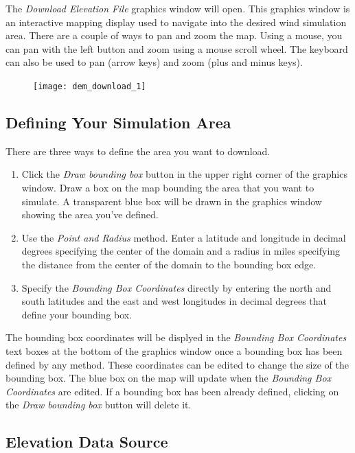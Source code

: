 \documentclass[12pt]{article}
\begin{document}
The \textit{Download Elevation File} graphics window will open. This graphics window is an interactive mapping display used to navigate into the desired wind simulation area. There are a couple of ways to pan and zoom the map.  Using a mouse, you can pan with the left button and zoom using a mouse scroll wheel.  The keyboard can also be used to pan (arrow keys) and zoom (plus and minus keys).

\begin{figure}[H]
	\centering
	\label{}
	\texttt{[image: dem\_download\_1]}
\end{figure}

\subsection*{Defining Your Simulation Area}

There are three ways to define the area you want to download. 
\begin{enumerate}
\item Click the \textit{Draw bounding box} button in the upper right corner of the graphics window. Draw a box on the map bounding the area that you want to simulate. A transparent blue box will be drawn in the graphics window showing the area you've defined. 
\item Use the \textit{Point and Radius} method. Enter a latitude and longitude in decimal degrees specifying the center of the domain and a radius in miles specifying the distance from the center of the domain to the bounding box edge.
\item Specify the \textit{Bounding Box Coordinates} directly by entering the north and south latitudes and the east and west longitudes in decimal degrees that define your bounding box.
\end{enumerate}
The bounding box coordinates will be displyed in the \textit{Bounding Box Coordinates} text boxes at the bottom of the graphics window once a bounding box has been defined by any method. These coordinates can be edited to change the size of the bounding box. The blue box on the map will update when the \textit{Bounding Box Coordinates} are edited. If a bounding box has been already defined, clicking on the \textit{Draw bounding box} button will delete it.

\subsection*{Elevation Data Source}
\end{document}
